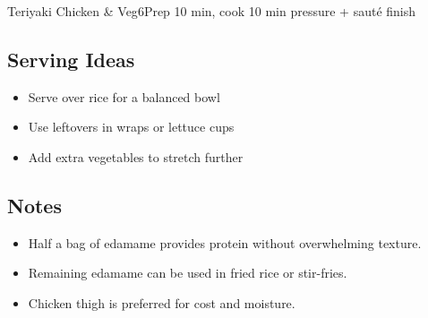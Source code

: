 \begin{recipebox}{Teriyaki Chicken \& Veg}{6}{Prep 10 min, cook 10 min pressure + sauté finish}
\subsection*{Serving Ideas}
\begin{itemize}
    \item Serve over rice for a balanced bowl
    \item Use leftovers in wraps or lettuce cups
    \item Add extra vegetables to stretch further
\end{itemize}

\subsection*{Notes}
\begin{itemize}
    \item Half a bag of edamame provides protein without overwhelming texture.
    \item Remaining edamame can be used in fried rice or stir-fries.
    \item Chicken thigh is preferred for cost and moisture.
\end{itemize}
\end{recipebox}
